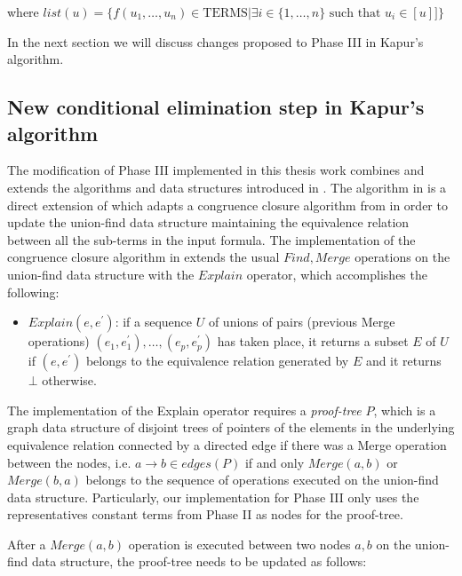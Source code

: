 where $list(u) = \{ f(u_1, \dots, u_n) \in \text{TERMS} 
| \exists i \in \{1, \dots, n\} \text{ such that } u_i \in [u] ] \}$

In the next section we will discuss changes proposed to 
Phase III in Kapur's algorithm. 

\subsection{New conditional elimination 
step in Kapur's algorithm}

The modification of Phase III implemented in this thesis work
combines and extends the algorithms and data structures introduced
in \cite{GALLIER1987233, 10.1007/978-3-540-32033-3_33}.
The algorithm in \cite{GALLIER1987233} is a direct
extension of \cite{DOWLING1984267} which adapts a 
congruence closure algorithm from 
\cite{10.1145/322186.322198, 10.1145/322217.322228} in order
to update the union-find data structure maintaining the
equivalence relation between all the sub-terms in the input
formula. The implementation of the congruence closure
algorithm in \cite{10.1007/978-3-540-32033-3_33}
extends the usual $Find, Merge$ operations on the 
union-find data structure with the $Explain$ operator, 
which accomplishes the following:

\begin{itemize} \label{explain_def}
  \item[] $Explain(e, e^{'})$: if a sequence $U$ of
    unions of pairs (previous Merge operations) 
    $(e_1, e_1^{'}), \dots, (e_p, e_p^{'})$
    has taken place, it returns a subset $E$
    of $U$ if $(e, e^{'})$ belongs to the equivalence
    relation generated by $E$ and it returns $\bot$
    otherwise.
\end{itemize}

The implementation of the Explain operator requires a 
\emph{proof-tree} $P$, which is a graph data structure of disjoint
trees of pointers
of the elements in the underlying equivalence relation connected
by a directed edge if there was a Merge operation 
between the nodes, i.e. $a \rightarrow b \in edges(P)$ if and only 
$Merge(a, b)$ or $Merge(b, a)$ belongs to the sequence of 
operations executed on the union-find data structure.
Particularly, our implementation for Phase III 
only uses the representatives
constant terms from Phase II as nodes for the proof-tree.

After a $Merge(a, b)$ operation is executed between 
two nodes $a, b$ on the union-find
data structure, the proof-tree needs to be updated as follows:

